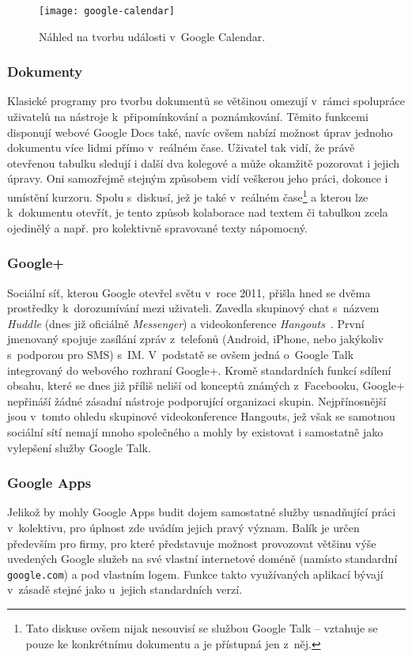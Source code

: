 \documentclass[12pt,oneside,final]{fithesis2}
\begin{document}
\begin{figure}[H]
    \texttt{[image: google-calendar]}
    \caption{Náhled na tvorbu události v~Google Calendar.}
\end{figure}

\subsubsection*{Dokumenty}
Klasické programy pro tvorbu dokumentů se většinou omezují v~rámci spolupráce uživatelů na nástroje k~připomínkování a poznámkování. Těmito funkcemi disponují webové Google Docs také, navíc ovšem nabízí možnost úprav jednoho dokumentu více lidmi přímo v~reálném čase. Uživatel tak vidí, že právě otevřenou tabulku sledují i další dva kolegové a může okamžitě pozorovat i jejich úpravy. Oni samozřejmě stejným způsobem vidí veškerou jeho práci, dokonce i umístění kurzoru. Spolu s~diskusí, jež je také v~reálném čase\footnote{Tato diskuse ovšem nijak nesouvisí se službou Google Talk -- vztahuje se pouze ke konkrétnímu dokumentu a je přístupná jen z~něj.} a kterou lze k~dokumentu otevřít, je tento způsob kolaborace nad textem či tabulkou zcela ojedinělý a např. pro kolektivně spravované texty nápomocný.

\subsubsection*{Google+}
Sociální síť, kterou Google otevřel světu v~roce 2011, přišla hned se dvěma  prostředky k~dorozumívání mezi uživateli. Zavedla skupinový chat s~názvem \emph{Huddle} (dnes již oficiálně \emph{Messenger}) a videokonference \emph{Hangouts}~\cite{gundotra2010introducing}. První jmenovaný spojuje zasílání zpráv z~telefonů (Android, iPhone, nebo jakýkoliv s~podporou pro SMS) s~IM. V~podstatě se ovšem jedná o~Google Talk integrovaný do webového rozhraní Google+. Kromě standardních funkcí sdílení obsahu, které se dnes již příliš neliší od konceptů známých z~Facebooku, Google+ nepřináší žádné zásadní nástroje podporující organizaci skupin. Nejpřínosnější jsou v~tomto ohledu skupinové videokonference Hangouts, jež však se samotnou sociální sítí nemají mnoho společného a mohly by existovat i samostatně jako vylepšení služby Google Talk.

\subsubsection*{Google Apps}\label{googleApps}
Jelikož by mohly Google Apps budit dojem samostatné služby usnadňující práci v~kolektivu, pro úplnost zde uvádím jejich pravý význam. Balík je určen především pro firmy, pro které představuje možnost provozovat většinu výše uvedených Google služeb na své vlastní internetové doméně (namísto standardní {\tt google.com}) a pod vlastním logem. Funkce takto využívaných aplikací bývají v~zásadě stejné jako u~jejich standardních verzí.
\end{document}
